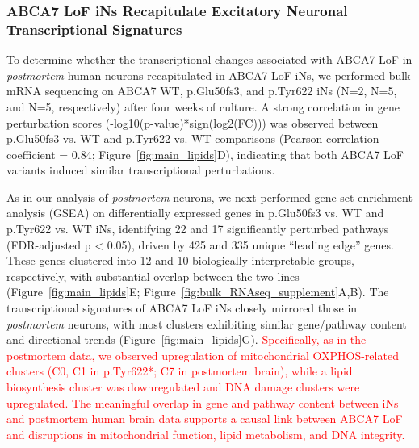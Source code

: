 \subsubsection{ABCA7 LoF iNs Recapitulate Excitatory Neuronal Transcriptional Signatures}
To determine whether the transcriptional changes associated with ABCA7 LoF in \emph{postmortem} human neurons recapitulated in ABCA7 LoF iNs, we performed bulk mRNA sequencing on ABCA7 WT, p.Glu50fs3, and p.Tyr622 iNs (N=2, N=5, and N=5, respectively) after four weeks of culture. A strong correlation in gene perturbation scores (-log10(p-value)*sign(log2(FC))) was observed between p.Glu50fs3 vs. WT and p.Tyr622 vs. WT comparisons (Pearson correlation coefficient = 0.84; Figure~\ref{fig:main_lipids}D), indicating that both ABCA7 LoF variants induced similar transcriptional perturbations.

As in our analysis of \emph{postmortem} neurons, we next performed gene set enrichment analysis (GSEA) on differentially expressed genes in p.Glu50fs3 vs. WT and p.Tyr622 vs. WT iNs, identifying 22 and 17 significantly perturbed pathways (FDR-adjusted p < 0.05), driven by 425 and 335 unique “leading edge” genes\cite{Subramanian2005-pu}. These genes clustered into 12 and 10 biologically interpretable groups, respectively, with substantial overlap between the two lines (Figure~\ref{fig:main_lipids}E; Figure~\ref{fig:bulk_RNAseq_supplement}A,B). The transcriptional signatures of ABCA7 LoF iNs closely mirrored those in \emph{postmortem} neurons, with most clusters exhibiting similar gene/pathway content and directional trends (Figure~\ref{fig:main_lipids}G). \textcolor{red}{Specifically, as in the postmortem data, we observed upregulation of mitochondrial OXPHOS-related clusters (C0, C1 in p.Tyr622*; C7 in postmortem brain), while a lipid biosynthesis cluster was downregulated and DNA damage clusters were upregulated. The meaningful overlap in gene and pathway content between iNs and postmortem human brain data supports a causal link between ABCA7 LoF and disruptions in mitochondrial function, lipid metabolism, and DNA integrity.}

